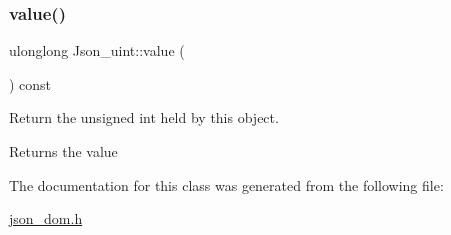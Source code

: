 \subsubsection{\texorpdfstring{value()}{value()}}
{\footnotesize\ttfamily ulonglong Json\+\_\+uint\+::value (\begin{DoxyParamCaption}{ }\end{DoxyParamCaption}) const\hspace{0.3cm}{\ttfamily [inline]}}

Return the unsigned int held by this object. \begin{DoxyReturn}{Returns}
the value 
\end{DoxyReturn}


The documentation for this class was generated from the following file\+:\begin{DoxyCompactItemize}
\item 
\mbox{\hyperlink{json__dom_8h}{json\+\_\+dom.\+h}}\end{DoxyCompactItemize}
